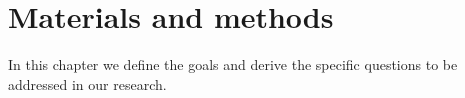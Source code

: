 \chapter{Materials and methods}
\label{cap:thesis_objectives}

In this chapter we define the goals and derive the specific questions to be addressed in our research.
